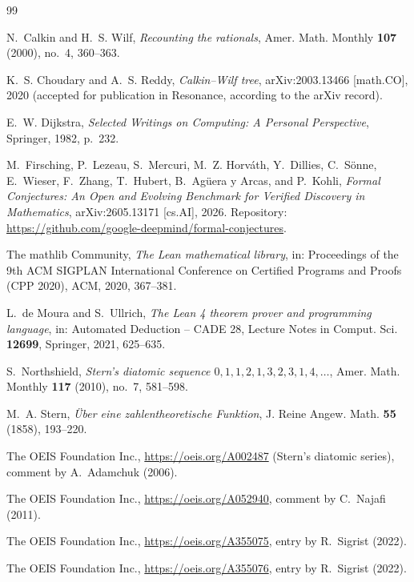 \documentclass[11pt]{amsart}
\theoremstyle{plain}
\theoremstyle{definition}
\begin{document}
\begin{thebibliography}{99}

N.~Calkin and H.~S. Wilf, \emph{Recounting the rationals}, Amer. Math. Monthly \textbf{107} (2000), no.~4, 360--363.

K.~S. Choudary and A.~S. Reddy, \emph{Calkin--Wilf tree}, arXiv:2003.13466 [math.CO], 2020 (accepted for publication in Resonance, according to the arXiv record).

E.~W. Dijkstra, \emph{Selected Writings on Computing: A Personal Perspective}, Springer, 1982, p.~232.

M.~Firsching, P.~Lezeau, S.~Mercuri, M.~Z. Horv\'ath, Y.~Dillies, C.~S\"onne, E.~Wieser, F.~Zhang, T.~Hubert, B.~Ag\"uera y Arcas, and P.~Kohli, \emph{Formal Conjectures: An Open and Evolving Benchmark for Verified Discovery in Mathematics}, arXiv:2605.13171 [cs.AI], 2026. Repository: \url{https://github.com/google-deepmind/formal-conjectures}.

The mathlib Community, \emph{The Lean mathematical library}, in: Proceedings of the 9th ACM SIGPLAN International Conference on Certified Programs and Proofs (CPP 2020), ACM, 2020, 367--381.

L.~de Moura and S.~Ullrich, \emph{The Lean 4 theorem prover and programming language}, in: Automated Deduction -- CADE 28, Lecture Notes in Comput. Sci. \textbf{12699}, Springer, 2021, 625--635.

S.~Northshield, \emph{Stern's diatomic sequence $0,1,1,2,1,3,2,3,1,4,\dots$}, Amer. Math. Monthly \textbf{117} (2010), no.~7, 581--598.

M.~A. Stern, \emph{\"Uber eine zahlentheoretische Funktion}, J. Reine Angew. Math. \textbf{55} (1858), 193--220.

The OEIS Foundation Inc., \url{https://oeis.org/A002487} (Stern's diatomic series), comment by A.~Adamchuk (2006).

The OEIS Foundation Inc., \url{https://oeis.org/A052940}, comment by C.~Najafi (2011).

The OEIS Foundation Inc., \url{https://oeis.org/A355075}, entry by R.~Sigrist (2022).

The OEIS Foundation Inc., \url{https://oeis.org/A355076}, entry by R.~Sigrist (2022).

\end{thebibliography}
\end{document}
